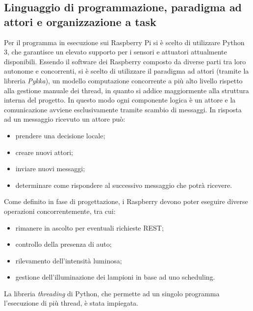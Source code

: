 \subsection{Linguaggio di programmazione, paradigma ad attori e organizzazione a task}
Per il programma in esecuzione sui Raspberry Pi si è scelto di utilizzare Python 3, che garantisce un elevato supporto per i sensori e attuatori attualmente disponibili.
Essendo il software dei Raspberry composto da diverse parti tra loro autonome e concorrenti, si è scelto di utilizzare il paradigma ad attori (tramite la libreria \textit{Pykka}), un modello computazione concorrente a più alto livello rispetto alla gestione manuale dei thread, in quanto si addice maggiormente alla struttura interna del progetto.
In questo modo ogni componente logica è un attore e la comunicazione avviene esclusivamente tramite scambio di messaggi. In risposta ad un messaggio ricevuto un attore può:
\begin{itemize}
 \item prendere una decisione locale;
 \item creare nuovi attori;
 \item inviare nuovi messaggi;
 \item determinare come rispondere al successivo messaggio che potrà ricevere.
\end{itemize}
Come definito in fase di progettazione, i Raspberry devono poter eseguire diverse operazioni concorrentemente, tra cui:
\begin{itemize}
 \item rimanere in ascolto per eventuali richieste REST;
 \item controllo della presenza di auto;
 \item rilevamento dell'intensità luminosa;
 \item gestione dell'illuminazione dei lampioni in base ad uno scheduling.
\end{itemize}
La libreria \textit{threading} di Python, che permette ad un singolo programma l'esecuzione di più thread, è stata impiegata.

